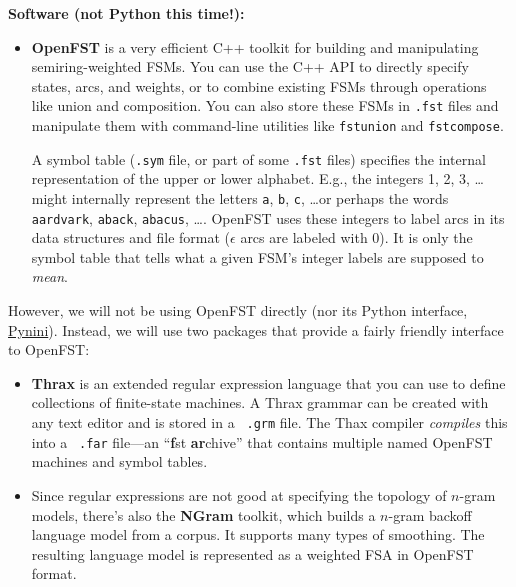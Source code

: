 \documentclass[11pt]{article}
\newcommand{\Note}[1]{}
\newcommand{\NoteSigned}[3]{{\sethlcolor{#2}\Note{#1: #3}}}
\newcommand{\NoteJE}[1]{\NoteSigned{JE}{YellowGreen}{#1}}
\newcommand{\NoteFF}[1]{\NoteSigned{FF}{LightBlue}{#1}}
\begin{document}
\noindent\textbf{Software (not Python this time!):}
\begin{itemize}
\item {\bf OpenFST} is a very efficient C++ toolkit for building and
  manipulating semiring-weighted FSMs.  You can use the C++ API to
  directly specify states, arcs, and weights, or to combine existing
  FSMs through operations like union and composition.  You can also
  store these FSMs in {\tt .fst} files and manipulate them with
  command-line utilities like {\tt fstunion} and {\tt fstcompose}.

  A symbol table ({\tt .sym} file, or part of some {\tt .fst} files)
  specifies the internal representation of the upper or lower
  alphabet.  E.g., the integers 1, 2, 3, \ldots might internally
  represent the letters {\tt a}, {\tt b}, {\tt c}, \ldots or perhaps
  the words {\tt aardvark}, {\tt aback}, {\tt abacus}, \ldots.
  OpenFST uses these integers to label arcs in its data structures and
  file format ($\epsilon$ arcs are labeled with 0).  It is only the
  symbol table that tells what a given FSM's integer labels are
  supposed to {\em mean}.\NoteJE{hmm, is that still true nowadays?
    fstinfo actually seems to say that the fst file includes a symbol
    table} \NoteFF{That may be true for openfst commands, but maybe
    not for Thrax? See issues 5 and 7.}
\end{itemize}
However, we will not be using OpenFST directly (nor its Python
interface, \href{http://www.openfst.org/twiki/bin/view/GRM/PyniniDownload}{Pynini}).  Instead, we will use
two packages that provide a fairly friendly interface to OpenFST:
\begin{itemize}
\item {\bf Thrax} is an extended regular expression language that you
  can use to define collections of finite-state machines.  A Thrax
  grammar can be created with any text editor and is stored in a {\tt
    .grm} file.  The Thax compiler {\em compiles} this into a {\tt
    .far} file---an ``\textbf{f}st \textbf{ar}chive'' that contains
  multiple named OpenFST machines and symbol tables.
\item Since regular expressions are not good at specifying the
  topology of $n$-gram models, there's also the {\bf NGram} toolkit,
  which builds a $n$-gram backoff language model from a corpus.  It
  supports many types of smoothing.  The resulting language model is
  represented as a weighted FSA in OpenFST format.
\end{itemize}
\end{document}
